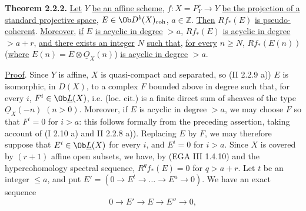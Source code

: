 \textbf{Theorem 2.2.2.} \uline{Let} \(Y\) \uline{be an affine scheme}, \(f:X=P^r_Y\longrightarrow Y\) \uline{be the projection of a standard projective space}, \(E\in\Ob D^b(X)_{\mathrm{coh}}\), \(a\in\mathbb Z\). \uline{Then} \(Rf_*(E)\) \uline{is pseudo-coherent}. \uline{Moreover}, \uline{if} \(E\) \uline{is acyclic in degree} \(>a\), \(Rf_*(E)\) \uline{is acyclic in degree} \(>a+r\), \uline{and there exists an integer} \(N\) \uline{such that}, \uline{for every} \(n\geq N\), \(Rf_*(E(n))\) (\uline{where} \(E(n)=E\otimes\underline{O}_X(n)\)) \uline{is acyclic in degree} \(>a\).

\uline{Proof}. Since \(Y\) is affine, \(X\) is quasi-compact and separated, so (II 2.2.9 a)) \(E\) is isomorphic, in \(D(X)\), to a complex \(F\) bounded above in degree such that, for every \(i\), \(F^i\in\Ob \underline{L}(X)\), i.e. (loc. cit.) is a finite direct sum of sheaves of the type \(\underline{O}_X(-n)\) \((n>0)\). Moreover, if \(E\) is acyclic in degree \(>a\), we may choose \(F\) so that \(F^i=0\) for \(i>a\): this follows formally from the preceding assertion, taking account of (I 2.10 a) and II 2.2.8 a)). Replacing \(E\) by \(F\), we may therefore suppose that \(E^i\in\Ob \underline{L}(X)\) for every \(i\), and \(E^i=0\) for \(i>a\). Since \(X\) is covered by \((r+1)\) affine open subsets, we have, by (EGA III 1.4.10) and the hypercohomology spectral sequence, \(R^qf_*(E)=0\) for \(q>a+r\). Let \(t\) be an integer \(\leq a\), and put \(E'=(0\to E^t\to\ldots\to E^a\to0)\). We have an exact sequence
\[
  0\longrightarrow E'\longrightarrow E\longrightarrow E''\longrightarrow0,
\]

